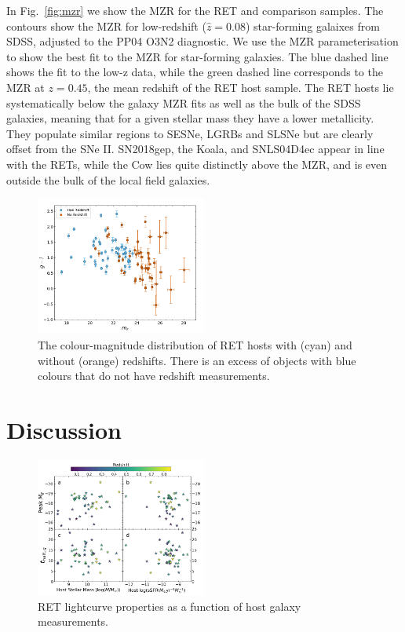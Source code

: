 \documentclass[fleqn,usenatbib,]{mnras}
\newcommand{\phil}[1]{\color{red}#1 \color{black}}
\begin{document}
In Fig.~\ref{fig:mzr} we show the MZR for the RET and comparison samples. The contours show the MZR for low-redshift ($\hat{z}=0.08$) star-forming galaixes from SDSS, adjusted to the PP04 O3N2 diagnostic. We use the MZR parameterisation \citet{Zahid2014} to show the best fit to the MZR for star-forming galaxies. The blue dashed line shows the fit to the low-z data, while the green dashed line corresponds to the MZR at $z=0.45$, the mean redshift of the RET host sample. The RET hosts lie systematically below the galaxy MZR fits as well as the bulk of the SDSS galaxies, meaning that for a given stellar mass they have a lower metallicity. They populate similar regions to SESNe, LGRBs and SLSNe but are clearly offset from the SNe II. \phil{SN2018gep, the Koala, and SNLS04D4ec appear in line with the RETs, while the Cow lies quite distinctly above the MZR, and is even outside the bulk of the local field galaxies.}

\begin{figure}
\includegraphics[width=0.5\textwidth]{figs/mag_v_colour.png}
\caption{The colour-magnitude distribution of RET hosts with (cyan) and without (orange) redshifts. There is an excess of objects with blue colours that do not have redshift measurements.
\label{fig:g-i}}
\end{figure}

\section{Discussion}
\label{sec:disc}
\begin{figure}
\includegraphics[width=0.5\textwidth]{figs/RET_vs_host.png}
\caption{RET lightcurve properties as a function of host galaxy measurements.
\label{fig:ret_v_host}}
\end{figure}
\end{document}

